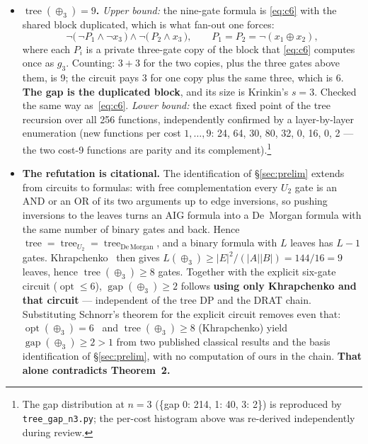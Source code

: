 \documentclass[11pt]{article}
\DeclareMathOperator{\opt}{opt}
\DeclareMathOperator{\tree}{tree}
\DeclareMathOperator{\gapop}{gap}
\theoremstyle{plain}
\begin{document}
\begin{itemize}
  \item \textbf{$\tree(\oplus_3) = 9$.} \emph{Upper bound:} the nine-gate formula is
  \eqref{eq:c6} with the shared block duplicated, which is what fan-out one forces:
  \begin{equation}\label{eq:w9}
    \neg\bigl(\,\neg P_1 \wedge \neg x_3\,\bigr) \wedge \neg\bigl(\,P_2 \wedge x_3\,\bigr),
    \qquad P_1 = P_2 = \neg(x_1 \oplus x_2),
  \end{equation}
  where each $P_i$ is a private three-gate copy of the block that \eqref{eq:c6} computes once as
  $g_3$. Counting: $3 + 3$ for the two copies, plus the three gates above them, is 9; the circuit
  pays $3$ for one copy plus the same three, which is 6. \textbf{The gap is the duplicated block},
  and its size is Krinkin's $s = 3$. Checked the same way as~\eqref{eq:c6}. \emph{Lower bound:} the exact fixed point of the tree recursion over all 256
  functions, independently confirmed by a layer-by-layer enumeration (new functions per cost
  $1,\dots,9$: 24, 64, 30, 80, 32, 0, 16, 0, 2 --- the two cost-9 functions are parity and its
  complement).\footnote{The gap distribution at $n = 3$ (\{gap 0: 214, 1: 40, 3: 2\}) is reproduced
  by \texttt{tree\_gap\_n3.py}; the per-cost histogram above was re-derived independently during
  review.}

  \item \textbf{The refutation is citational.} The identification of \S\ref{sec:prelim} extends
  from circuits to formulas: with free complementation every $U_2$ gate is an AND or an OR of its
  two arguments up to edge inversions, so pushing inversions to the leaves turns an AIG formula
  into a De~Morgan formula with the same number of binary gates and back. Hence
  $\tree = \tree_{U_2} = \tree_{\mathrm{De\,Morgan}}$, and a binary formula with $L$ leaves has
  $L-1$ gates. Khrapchenko~\cite{khrapchenko1971} then gives
  $L(\oplus_3) \ge |E|^2/(|A||B|) = 144/16 = 9$ leaves, hence $\tree(\oplus_3) \ge 8$ gates.
  Together with the explicit six-gate circuit ($\opt \le 6$), $\gapop(\oplus_3) \ge 2$ follows
  \textbf{using only Khrapchenko and that circuit} --- independent of the tree DP and the DRAT
  chain. Substituting Schnorr's theorem for the explicit circuit removes even that:
  $\opt(\oplus_3) = 6$~\cite{schnorr1974} and $\tree(\oplus_3) \ge 8$ (Khrapchenko) yield
  $\gapop(\oplus_3) \ge 2 > 1$ from two published classical results and the basis identification
  of \S\ref{sec:prelim}, with no computation of ours in the chain. \textbf{That alone contradicts
  Theorem~2.}


\end{itemize}
\end{document}

